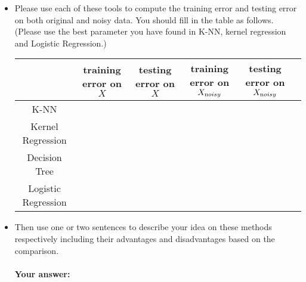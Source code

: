 \documentclass[english]{article}
\begin{document}
\begin{itemize}

\item Please use each of these tools to compute the training error and testing error on both original and noisy data. You should fill in the table as follows. (Please use the best parameter you have found in K-NN, kernel regression and Logistic Regression.)


\begin{table}[!htb]
\centering
\begin{tabular}{|c|c|c|c|c|c|} \hline
&training error on $X$& testing error on $X$&training error on $X_{\text noisy}$&testing error on $X_{\text noisy}$\\ \hline
K-NN&&&&\\ \hline
Kernel Regression &&&&\\ \hline
Decision Tree&&&& \\ \hline
Logistic Regression &&&&\\ \hline
\end{tabular}
\end{table} 

\item Then use one or two sentences to describe your idea on these methods respectively including their advantages and disadvantages based on the comparison. 

\paragraph{Your answer:}
 ~\\
 
\end{itemize}
\end{document}
